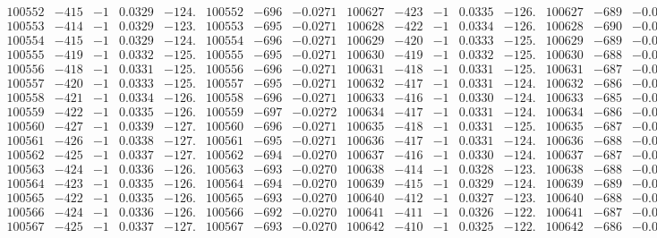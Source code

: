 \documentclass[11pt,reqno,a4letter]{article}
\numberwithin{figure}{section}
\numberwithin{table}{section}
\theoremstyle{plain}
\numberwithin{theorem}{section}
\theoremstyle{definition}
\begin{document}
\begin{table}[ht!]
\begin{equation*}
{\begin{array}{ccccc|ccc||ccccc|ccc}
100552 & -415 & -1 & 0.0329 & -124. & 100552 & -696 & -0.0271 & 100627 & -423 & -1 & 0.0335 & -126. & 100627 & -689 & -0.0268  \\
100553 & -414 & -1 & 0.0329 & -123. & 100553 & -695 & -0.0271 & 100628 & -422 & -1 & 0.0334 & -126. & 100628 & -690 & -0.0269  \\
100554 & -415 & -1 & 0.0329 & -124. & 100554 & -696 & -0.0271 & 100629 & -420 & -1 & 0.0333 & -125. & 100629 & -689 & -0.0268  \\
100555 & -419 & -1 & 0.0332 & -125. & 100555 & -695 & -0.0271 & 100630 & -419 & -1 & 0.0332 & -125. & 100630 & -688 & -0.0268  \\
100556 & -418 & -1 & 0.0331 & -125. & 100556 & -696 & -0.0271 & 100631 & -418 & -1 & 0.0331 & -125. & 100631 & -687 & -0.0267  \\
100557 & -420 & -1 & 0.0333 & -125. & 100557 & -695 & -0.0271 & 100632 & -417 & -1 & 0.0331 & -124. & 100632 & -686 & -0.0267  \\
100558 & -421 & -1 & 0.0334 & -126. & 100558 & -696 & -0.0271 & 100633 & -416 & -1 & 0.0330 & -124. & 100633 & -685 & -0.0267  \\
100559 & -422 & -1 & 0.0335 & -126. & 100559 & -697 & -0.0272 & 100634 & -417 & -1 & 0.0331 & -124. & 100634 & -686 & -0.0267  \\
100560 & -427 & -1 & 0.0339 & -127. & 100560 & -696 & -0.0271 & 100635 & -418 & -1 & 0.0331 & -125. & 100635 & -687 & -0.0267  \\
100561 & -426 & -1 & 0.0338 & -127. & 100561 & -695 & -0.0271 & 100636 & -417 & -1 & 0.0331 & -124. & 100636 & -688 & -0.0268  \\
100562 & -425 & -1 & 0.0337 & -127. & 100562 & -694 & -0.0270 & 100637 & -416 & -1 & 0.0330 & -124. & 100637 & -687 & -0.0267  \\
100563 & -424 & -1 & 0.0336 & -126. & 100563 & -693 & -0.0270 & 100638 & -414 & -1 & 0.0328 & -123. & 100638 & -688 & -0.0268  \\
100564 & -423 & -1 & 0.0335 & -126. & 100564 & -694 & -0.0270 & 100639 & -415 & -1 & 0.0329 & -124. & 100639 & -689 & -0.0268  \\
100565 & -422 & -1 & 0.0335 & -126. & 100565 & -693 & -0.0270 & 100640 & -412 & -1 & 0.0327 & -123. & 100640 & -688 & -0.0268  \\
100566 & -424 & -1 & 0.0336 & -126. & 100566 & -692 & -0.0270 & 100641 & -411 & -1 & 0.0326 & -122. & 100641 & -687 & -0.0267  \\
100567 & -425 & -1 & 0.0337 & -127. & 100567 & -693 & -0.0270 & 100642 & -410 & -1 & 0.0325 & -122. & 100642 & -686 & -0.0267  \\

\end{array}}
\end{equation*}
\end{table}
\end{document}

